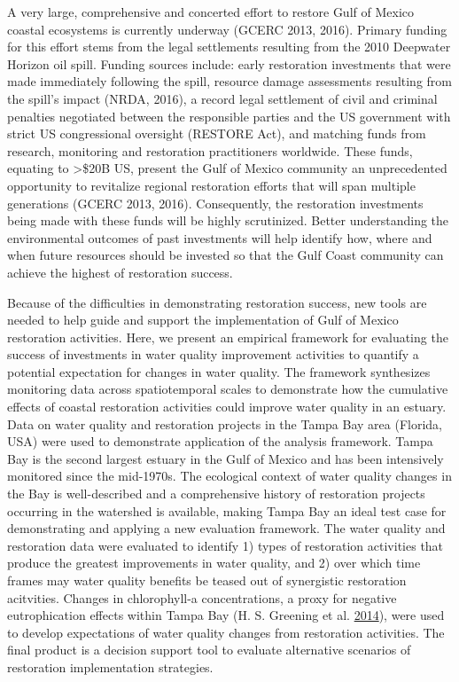 \documentclass[]{article}
\begin{document}
A very large, comprehensive and concerted effort to restore Gulf of
Mexico coastal ecosystems is currently underway (GCERC 2013, 2016).
Primary funding for this effort stems from the legal settlements
resulting from the 2010 Deepwater Horizon oil spill. Funding sources
include: early restoration investments that were made immediately
following the spill, resource damage assessments resulting from the
spill's impact (NRDA, 2016), a record legal settlement of civil and
criminal penalties negotiated between the responsible parties and the US
government with strict US congressional oversight (RESTORE Act), and
matching funds from research, monitoring and restoration practitioners
worldwide. These funds, equating to \textgreater{}\$20B US, present the
Gulf of Mexico community an unprecedented opportunity to revitalize
regional restoration efforts that will span multiple generations (GCERC
2013, 2016). Consequently, the restoration investments being made with
these funds will be highly scrutinized. Better understanding the
environmental outcomes of past investments will help identify how, where
and when future resources should be invested so that the Gulf Coast
community can achieve the highest of restoration success.

Because of the difficulties in demonstrating restoration success, new
tools are needed to help guide and support the implementation of Gulf of
Mexico restoration activities. Here, we present an empirical framework
for evaluating the success of investments in water quality improvement
activities to quantify a potential expectation for changes in water
quality. The framework synthesizes monitoring data across spatiotemporal
scales to demonstrate how the cumulative effects of coastal restoration
activities could improve water quality in an estuary. Data on water
quality and restoration projects in the Tampa Bay area (Florida, USA)
were used to demonstrate application of the analysis framework. Tampa
Bay is the second largest estuary in the Gulf of Mexico and has been
intensively monitored since the mid-1970s. The ecological context of
water quality changes in the Bay is well-described and a comprehensive
history of restoration projects occurring in the watershed is available,
making Tampa Bay an ideal test case for demonstrating and applying a new
evaluation framework. The water quality and restoration data were
evaluated to identify 1) types of restoration activities that produce
the greatest improvements in water quality, and 2) over which time
frames may water quality benefits be teased out of synergistic
restoration acitvities. Changes in chlorophyll-a concentrations, a proxy
for negative eutrophication effects within Tampa Bay (H. S. Greening et
al. \protect\hyperlink{ref-Greening2014}{2014}), were used to develop
expectations of water quality changes from restoration activities. The
final product is a decision support tool to evaluate alternative
scenarios of restoration implementation strategies.
\end{document}
